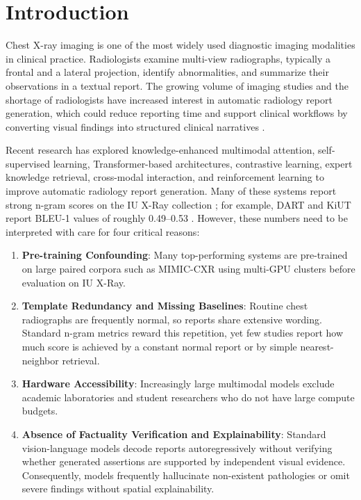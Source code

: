 \documentclass[12pt,a4paper]{report}
\begin{document}
\chapter{Introduction}

Chest X-ray imaging is one of the most widely used diagnostic imaging modalities in clinical practice. Radiologists examine multi-view radiographs, typically a frontal and a lateral projection, identify abnormalities, and summarize their observations in a textual report. The growing volume of imaging studies and the shortage of radiologists have increased interest in automatic radiology report generation, which could reduce reporting time and support clinical workflows by converting visual findings into structured clinical narratives \cite{chen2020generating, tanida2023interactive}.

Recent research has explored knowledge-enhanced multimodal attention, self-supervised learning, Transformer-based architectures, contrastive learning, expert knowledge retrieval, cross-modal interaction, and reinforcement learning to improve automatic radiology report generation. Many of these systems report strong n-gram scores on the IU X-Ray collection \cite{demner2016preparing}; for example, DART and KiUT report BLEU-1 values of roughly 0.49--0.53 \cite{park2025dart, huang2023kiut}. However, these numbers need to be interpreted with care for four critical reasons:

\begin{enumerate}
    \item \textbf{Pre-training Confounding}: Many top-performing systems are pre-trained on large paired corpora such as MIMIC-CXR \cite{johnson2019mimic} using multi-GPU clusters before evaluation on IU X-Ray.
    \item \textbf{Template Redundancy and Missing Baselines}: Routine chest radiographs are frequently normal, so reports share extensive wording. Standard n-gram metrics reward this repetition, yet few studies report how much score is achieved by a constant normal report or by simple nearest-neighbor retrieval.
    \item \textbf{Hardware Accessibility}: Increasingly large multimodal models exclude academic laboratories and student researchers who do not have large compute budgets.
    \item \textbf{Absence of Factuality Verification and Explainability}: Standard vision-language models decode reports autoregressively without verifying whether generated assertions are supported by independent visual evidence. Consequently, models frequently hallucinate non-existent pathologies or omit severe findings without spatial explainability.
\end{enumerate}
\end{document}
